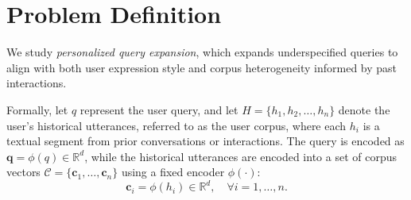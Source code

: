 \section{Problem Definition}

We study \textit{personalized query expansion}, which expands underspecified queries to align with both user expression style and corpus heterogeneity informed by past interactions.

Formally, let $q$ represent the user query, and let $H = \{h_1, h_2, \dots, h_n\}$ denote the user's historical utterances, referred to as the user corpus, where each $h_i$ is a textual segment from prior conversations or interactions. The query is encoded as $\mathbf{q} = \phi(q) \in \mathbb{R}^d$, while the historical utterances are encoded into a set of corpus vectors $\mathcal{C} = \{\mathbf{c}_1, \dots, \mathbf{c}_n\}$ using a fixed encoder $\phi(\cdot)$:
\begin{equation}
\mathbf{c}_i = \phi(h_i) \in \mathbb{R}^d, \quad \forall i = 1, \dots, n.
\label{eq:c_i}
\end{equation}



